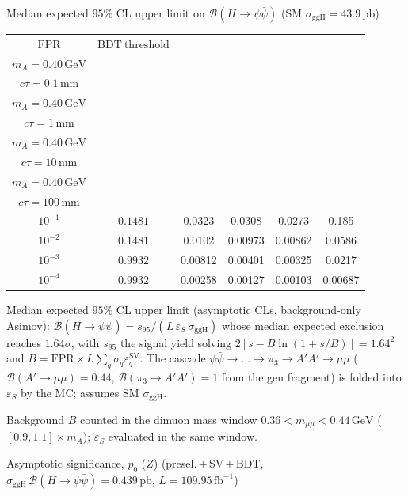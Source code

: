 \documentclass[10pt,a4paper]{article}
\begin{document}
{\vspace{12pt}

Median expected $95\%$ CL upper limit on $\mathcal{B}(H\to\psi\bar{\psi})$ (SM $\sigma_{\mathrm{ggH}}=43.9\,\mathrm{pb}$)

\begin{tabular}{cccccc}
\toprule
$\mathrm{FPR}$ & $\mathrm{BDT\ threshold}$ & \shortstack{$m_{\pi}=4\,\mathrm{GeV}$\\$m_{A}=0.40\,\mathrm{GeV}$\\$c\tau=0.1\,\mathrm{mm}$} & \shortstack{$m_{\pi}=4\,\mathrm{GeV}$\\$m_{A}=0.40\,\mathrm{GeV}$\\$c\tau=1\,\mathrm{mm}$} & \shortstack{$m_{\pi}=4\,\mathrm{GeV}$\\$m_{A}=0.40\,\mathrm{GeV}$\\$c\tau=10\,\mathrm{mm}$} & \shortstack{$m_{\pi}=4\,\mathrm{GeV}$\\$m_{A}=0.40\,\mathrm{GeV}$\\$c\tau=100\,\mathrm{mm}$} \\
\midrule
$10^{-1}$ & $0.1481$ & 0.0323 & 0.0308 & 0.0273 & 0.185\\
$10^{-2}$ & $0.1481$ & 0.0102 & 0.00973 & 0.00862 & 0.0586\\
$10^{-3}$ & $0.9932$ & 0.00812 & 0.00401 & 0.00325 & 0.0217\\
$10^{-4}$ & $0.9932$ & 0.00258 & 0.00127 & 0.00103 & 0.00687\\
\bottomrule
\end{tabular}

{\small Median expected $95\%$ CL upper limit (asymptotic CLs, background-only Asimov): $\mathcal{B}(H\to\psi\bar{\psi})=s_{95}/(L\,\varepsilon_S\,\sigma_{\mathrm{ggH}})$ whose median expected exclusion reaches $1.64\sigma$, with $s_{95}$ the signal yield solving $2[s-B\ln(1{+}s/B)]=1.64^2$ and $B=\mathrm{FPR}\times L\sum_q\sigma_q\varepsilon_q^{\mathrm{SV}}$. The cascade $\psi\bar{\psi}\to\ldots\to\pi_3\to A'A'\to\mu\mu$ ($\mathcal{B}(A'\to\mu\mu)=0.44$, $\mathcal{B}(\pi_3\to A'A')=1$ from the gen fragment) is folded into $\varepsilon_S$ by the MC; assumes SM $\sigma_{\mathrm{ggH}}$.}

{\small Background $B$ counted in the dimuon mass window $0.36<m_{\mu\mu}<0.44\,\mathrm{GeV}$ ($[0.9,1.1]\times m_A$); $\varepsilon_S$ evaluated in the same window.}

\vspace{12pt}

Asymptotic significance, $p_0$ ($Z$) (presel.\,$+$\,SV\,$+$\,BDT, $\sigma_{\mathrm{ggH}}\,\mathcal{B}(H\to\psi\bar{\psi})=0.439\,\mathrm{pb}$, $L=109.95\,\mathrm{fb}^{-1}$)

}
\end{document}
